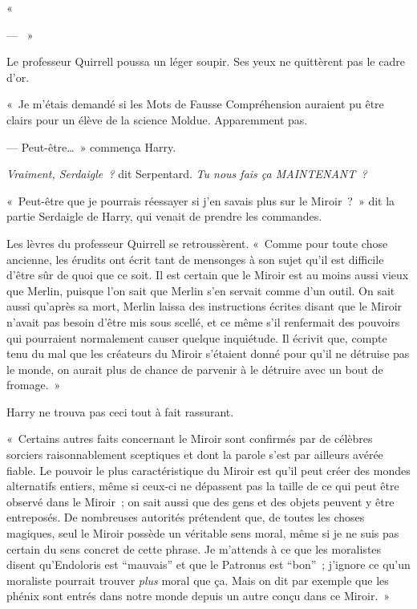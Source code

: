 «~

--- ~»

Le professeur Quirrell poussa un léger soupir. Ses yeux ne quittèrent pas le cadre d'or.

«~Je m'étais demandé si les Mots de Fausse Compréhension auraient pu être clairs pour un élève de la science Moldue. Apparemment pas.

--- Peut-être…~» commença Harry.

\emph{Vraiment, Serdaigle~?} dit Serpentard. \emph{Tu nous fais ça MAINTENANT~?}

«~Peut-être que je pourrais réessayer si j'en savais plus sur le Miroir~?~» dit la partie Serdaigle de Harry, qui venait de prendre les commandes.

Les lèvres du professeur Quirrell se retroussèrent. «~Comme pour toute chose ancienne, les érudits ont écrit tant de mensonges à son sujet qu'il est difficile d'être sûr de quoi que ce soit. Il est certain que le Miroir est au moins aussi vieux que Merlin, puisque l'on sait que Merlin s'en servait comme d'un outil. On sait aussi qu'après sa mort, Merlin laissa des instructions écrites disant que le Miroir n'avait pas besoin d'être mis sous scellé, et ce même s'il renfermait des pouvoirs qui pourraient normalement causer quelque inquiétude. Il écrivit que, compte tenu du mal que les créateurs du Miroir s'étaient donné pour qu'il ne détruise pas le monde, on aurait plus de chance de parvenir à le détruire avec un bout de fromage.~»

Harry ne trouva pas ceci tout à fait rassurant.

«~Certains autres faits concernant le Miroir sont confirmés par de célèbres sorciers raisonnablement sceptiques et dont la parole s'est par ailleurs avérée fiable. Le pouvoir le plus caractéristique du Miroir est qu'il peut créer des mondes alternatifs entiers, même si ceux-ci ne dépassent pas la taille de ce qui peut être observé dans le Miroir~; on sait aussi que des gens et des objets peuvent y être entreposés. De nombreuses autorités prétendent que, de toutes les choses magiques, seul le Miroir possède un véritable sens moral, même si je ne suis pas certain du sens concret de cette phrase. Je m'attends à ce que les moralistes disent qu'Endoloris est “mauvais” et que le Patronus est “bon”~; j'ignore ce qu'un moraliste pourrait trouver \emph{plus} moral que ça. Mais on dit par exemple que les phénix sont entrés dans notre monde depuis un autre conçu dans ce Miroir.~»

